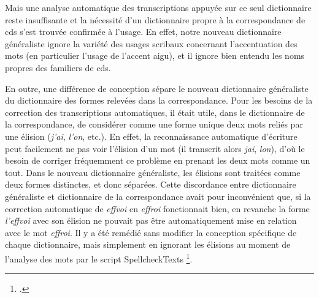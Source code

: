 \documentclass[a4paper,12pt,twoside]{book}
\begin{document}
				Mais une analyse automatique des transcriptions appuyée sur ce seul dictionnaire reste insuffisante et la nécessité d'un dictionnaire propre à la correspondance de \gls{cds} s'est trouvée confirmée à l'usage. En effet, notre nouveau dictionnaire généraliste ignore la variété des usages scribaux concernant l'accentuation des mots (en particulier l'usage de l'accent aigu), et il ignore bien entendu les noms propres des familiers de \gls{cds}. 
				
				En outre, une différence de conception sépare le nouveau dictionnaire généraliste du dictionnaire des formes relevées dans la correspondance. Pour les besoins de la correction des transcriptions automatiques, il était utile, dans le dictionnaire de la correspondance, de considérer comme une forme unique deux mots reliés par une élision (\textit{j'ai}, \textit{l'on}, etc.). En effet, la reconnaissance automatique d'écriture peut facilement ne pas voir l'élision d'un mot (il transcrit alors \textit{jai}, \textit{lon}), d'où le besoin de corriger fréquemment ce problème en prenant les deux mots comme un tout. Dans le nouveau dictionnaire généraliste, les élisions sont traitées comme deux formes distinctes, et donc séparées. Cette discordance entre dictionnaire généraliste et dictionnaire de la correspondance avait pour inconvénient que, si la correction automatique de \textit{effvoi} en \textit{effroi} fonctionnait bien, en revanche la forme \textit{l'effvoi} avec son élision ne pouvait pas être automatiquement mise en relation avec le mot \textit{effroi}. Il y a été remédié sans modifier la conception spécifique de chaque dictionnaire, mais simplement en ignorant les élisions au moment de l'analyse des mots par le script SpellcheckTexts
				\footcite{biaySpellcheckTextsPy2022}.
				
				
	\appendix
	
	\renewcommand{\appendixpagename}{Annexes}
	
	\renewcommand{\appendixtocname}{Annexes}
	
	\addappheadtotoc%
	
	\appendixpage %
	
\end{document}
